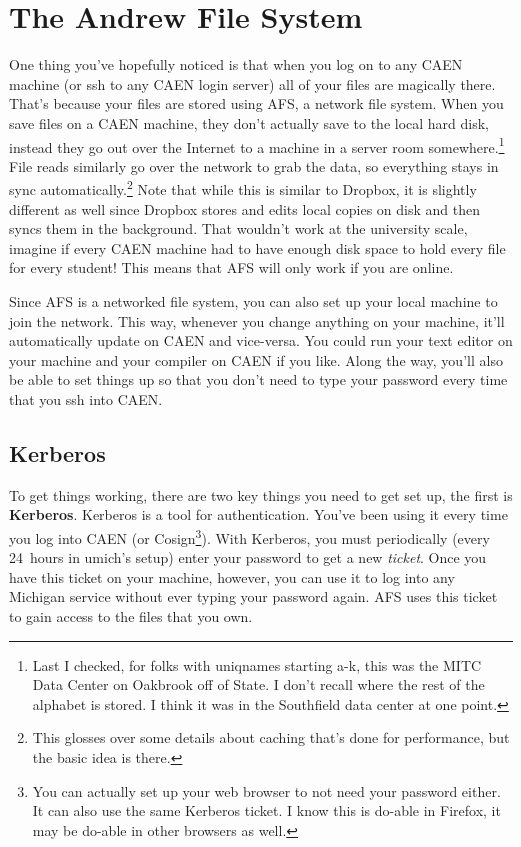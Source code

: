 \documentclass{article}
\begin{document}


\section*{The Andrew File System}

One thing you've hopefully noticed is that when you log on to any CAEN machine
(or ssh to any CAEN login server) all of your files are magically there.
That's because your files are stored using AFS, a network file system. When
you save files on a CAEN machine, they don't actually save to the local hard
disk, instead they go out over the Internet to a machine in a server room
somewhere.\footnote{Last I checked, for folks with uniqnames starting a-k,
this was the MITC Data Center on Oakbrook off of State. I don't recall where
the rest of the alphabet is stored. I think it was in the Southfield data
center at one point.} File reads similarly go over the network to grab the
data, so everything stays in sync automatically.\footnote{This glosses over
  some details about caching that's done for performance, but the basic idea
  is there.} Note that while this is similar to Dropbox, it is slightly
different as well since Dropbox stores and edits local copies on disk and then
syncs them in the background. That wouldn't work at the university scale,
imagine if every CAEN machine had to have enough disk space to hold every file
for every student! This means that AFS will only work if you are online.

Since AFS is a networked file system, you can also set up your local machine
to join the network.  This way, whenever you change anything on your machine,
it'll automatically update on CAEN and vice-versa. You could run your text
editor on your machine and your compiler on CAEN if you like. Along the way,
you'll also be able to set things up so that you don't need to type your
password every time that you ssh into CAEN.


\subsection*{Kerberos}

To get things working, there are two key things you need to get set up, the
first is \textbf{Kerberos}. Kerberos is a tool for authentication. You've been
using it every time you log into CAEN (or Cosign\footnote{
  You can actually set up your web browser to not need your password either.
  It can also use the same Kerberos ticket. I know this is do-able in Firefox,
  it may be do-able in other browsers as well.
}). With Kerberos, you must periodically (every 24~hours in umich's setup)
enter your password to get a new \emph{ticket}. Once you have this ticket on
your machine, however, you can use it to log into any Michigan service without
ever typing your password again. AFS uses this ticket to gain access to the
files that you own.
\end{document}
